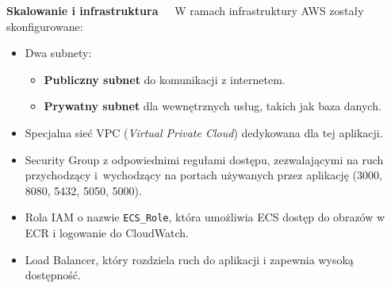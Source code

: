 \textbf{Skalowanie i infrastruktura~~}
W ramach infrastruktury AWS zostały skonfigurowane:
\begin{itemize}
    \item Dwa subnety:
    \begin{itemize}
        \item \textbf{Publiczny subnet} do komunikacji z internetem.
        \item \textbf{Prywatny subnet} dla wewnętrznych usług, takich jak baza danych.
    \end{itemize}
    \item Specjalna sieć VPC (\textit{Virtual Private Cloud}) dedykowana dla tej aplikacji.
    \item Security Group z odpowiednimi regułami dostępu, zezwalającymi na ruch przychodzący i~wychodzący na portach używanych przez aplikację (3000, 8080, 5432, 5050, 5000).
    \item Rola IAM o nazwie \texttt{ECS\_Role}, która umożliwia ECS dostęp do obrazów w ECR i logowanie do CloudWatch.
    \item Load Balancer, który rozdziela ruch do aplikacji i zapewnia wysoką dostępność.
\end{itemize}
